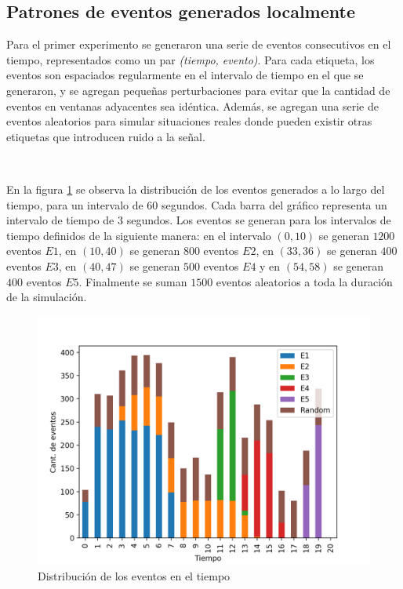 \documentclass[a4paper,12pt, oneside]{article}
\begin{document}
\subsection{Patrones de eventos generados localmente}
Para el primer experimento se generaron una serie de eventos consecutivos en el tiempo, representados como un par \textit{(tiempo, evento)}. Para cada etiqueta, los eventos son espaciados regularmente en el intervalo de tiempo en el que se generaron, y se agregan pequeñas perturbaciones para evitar que la cantidad de eventos en ventanas adyacentes sea idéntica. Además, se agregan una serie de eventos aleatorios para simular situaciones reales donde pueden existir otras etiquetas que introducen ruido a la señal.

\

En la figura \ref{fig:prueba1} se observa la distribución de los eventos generados a lo largo del tiempo, para un intervalo de 60 segundos. Cada barra del gráfico representa un intervalo de tiempo de $3$ segundos.
Los eventos se generan para los intervalos de tiempo definidos de la siguiente manera: en el intervalo $(0,10)$ se generan $1200$ eventos $E1$, en $(10,40)$ se generan $800$ eventos $E2$, en $(33,36)$ se generan $400$ eventos $E3$, en $(40,47)$ se generan $500$ eventos $E4$ y en $(54,58)$ se generan $400$ eventos $E5$. Finalmente se suman $1500$ eventos aleatorios a toda la duración de la simulación.

\begin{figure}[ht]
	\centering
	\includegraphics[scale=0.7]{graph/prueba1.png}
	\caption{Distribución de los eventos en el tiempo}
	\label{fig:prueba1}
\end{figure}
\end{document}
